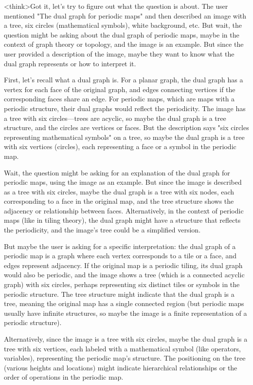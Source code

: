 <think>Got it, let's try to figure out what the question is about. The user mentioned "The dual graph for periodic maps" and then described an image with a tree, six circles (mathematical symbols), white background, etc. But wait, the question might be asking about the dual graph of periodic maps, maybe in the context of graph theory or topology, and the image is an example. But since the user provided a description of the image, maybe they want to know what the dual graph represents or how to interpret it. 

First, let's recall what a dual graph is. For a planar graph, the dual graph has a vertex for each face of the original graph, and edges connecting vertices if the corresponding faces share an edge. For periodic maps, which are maps with a periodic structure, their dual graphs would reflect the periodicity. The image has a tree with six circles—trees are acyclic, so maybe the dual graph is a tree structure, and the circles are vertices or faces. But the description says "six circles representing mathematical symbols" on a tree, so maybe the dual graph is a tree with six vertices (circles), each representing a face or a symbol in the periodic map. 

Wait, the question might be asking for an explanation of the dual graph for periodic maps, using the image as an example. But since the image is described as a tree with six circles, maybe the dual graph is a tree with six nodes, each corresponding to a face in the original map, and the tree structure shows the adjacency or relationship between faces. Alternatively, in the context of periodic maps (like in tiling theory), the dual graph might have a structure that reflects the periodicity, and the image's tree could be a simplified version. 

But maybe the user is asking for a specific interpretation: the dual graph of a periodic map is a graph where each vertex corresponds to a tile or a face, and edges represent adjacency. If the original map is a periodic tiling, its dual graph would also be periodic, and the image shows a tree (which is a connected acyclic graph) with six circles, perhaps representing six distinct tiles or symbols in the periodic structure. The tree structure might indicate that the dual graph is a tree, meaning the original map has a single connected region (but periodic maps usually have infinite structures, so maybe the image is a finite representation of a periodic structure). 

Alternatively, since the image is a tree with six circles, maybe the dual graph is a tree with six vertices, each labeled with a mathematical symbol (like operators, variables), representing the periodic map's structure. The positioning on the tree (various heights and locations) might indicate hierarchical relationships or the order of operations in the periodic map. 

